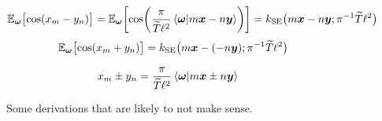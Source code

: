 \begin{figure*}
\begin{equation}
    \E_{\vec{\omega}}\bigl[ \cos(x_m - y_n) \bigr]
        = \E_{\vec{\omega}}\biggl[ \cos\biggl( \frac{\pi}{\tilde{T} \ell^2} \ip{\vec{\omega}}{m \vec{x} - n \vec{y}} \biggr) \biggr]
        = k_\mathrm{SE}\bigl( m \vec{x} - n \vec{y}; \pi^{-1} \tilde{T} \ell^2 \bigr)
\end{equation}
\begin{equation}
    \mathbb{E}_{\bm{\omega}}\bigl[ \cos(x_m + y_n) \bigr]
        = k_\mathrm{SE}\bigl( m \bm{x} - (-n \bm{y}); \pi^{-1} \widetilde{T} \ell^2 \bigr)
\end{equation}

\begin{align}
    x_m \pm y_n &= \frac{\pi}{\tilde{T} \ell^2} \ip{\vec{\omega}}{m \vec{x} \pm n \vec{y}}
\end{align}

    \caption{Some derivations that are likely to not make sense.}
\end{figure*}
